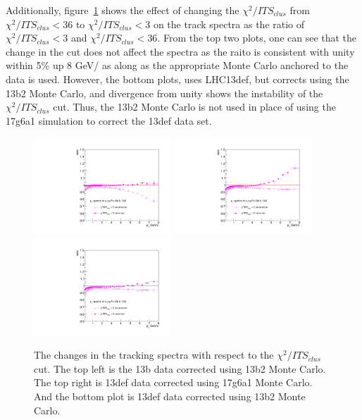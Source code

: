 Additionally, figure~\ref{fig:chi2SpectraComparison} shows the effect of changing the $\chi^2/ITS_{clus}$ from $\chi^2/ITS_{clus} < 36$ to $\chi^2/ITS_{clus} < 3$ on the track \pt spectra as the ratio of $\chi^2/ITS_{clus} <3$ and $\chi^2/ITS_{clus} < 36$. From the top two plots, one can see that the change in the cut does not affect the \pt spectra as the raito is consistent with unity within 5\% up 8 GeV/ as along as the appropriate Monte Carlo anchored to the data is used. However, the bottom plots, uses LHC13def, but corrects using the 13b2 Monte Carlo, and divergence from unity shows the instability of the $\chi^2/ITS_{clus}$ cut. Thus, the 13b2 Monte Carlo is not used in place of using the 17g6a1 simulation to correct the 13def data set.
\begin{figure}[h]
\center
\includegraphics[width=0.46\textwidth]{Checks_Systematics/ITSchi2_study_ptSpectra_ratio_MBMB.pdf}
\includegraphics[width=0.46\textwidth]{Checks_Systematics/ITSchi2_study_ptSpectra_ratio_MBGJ.pdf}
\includegraphics[width=0.46\textwidth]{Checks_Systematics/ITSchi2_study_ptSpectra_ratio_GJGJ.pdf}
\caption{The changes in the tracking spectra with respect to the $\chi^2/ITS_{clus}$ cut. The top left is the 13b data corrected using 13b2 Monte Carlo. The top right is 13def data corrected using 17g6a1 Monte Carlo. And the bottom plot is 13def data corrected using 13b2 Monte Carlo.\cite{10.1007/978-3-642-18211-2_166}}
\label{fig:chi2SpectraComparison}
\end{figure}

